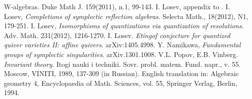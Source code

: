 \documentclass[12pt]{amsart}
\theoremstyle{definition}
\begin{document}
\begin{thebibliography}{99}
{W-algebras}. Duke Math J. 159(2011), n.1, 99-143.
 I. Losev, appendix to \cite{ES}.
 I. Losev, {\it Completions of symplectic reflection algebras}. Selecta Math., 18(2012), N1, 179-251.
 I. Losev, {\it Isomorphisms of quantizations via quantization of resolutions}. Adv. Math. 231(2012), 1216-1270.
 I. Losev. {\it Etingof conjecture for quantized quiver varieties II: affine quivers}.
arXiv:1405.4998.
 Y. Namikawa, {\it Fundamental groups of symplectic singularities}.
arXiv.1301.1008.
 V.L. Popov, E.B. Vinberg.
{\it Invariant theory}. Itogi nauki i techniki. Sovr. probl. matem.
Fund. napr., v. 55. Moscow, VINITI, 1989, 137-309 (in Russian).
English translation in: Algebraic geometry 4, Encyclopaedia of Math.
Sciences, vol. 55, Springer Verlag, Berlin, 1994.
\end{thebibliography}
\end{document}
